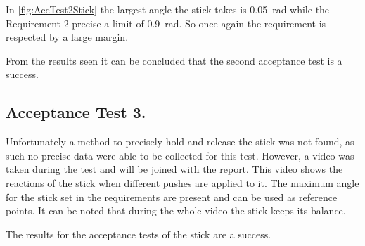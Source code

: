 In \autoref{fig:AccTest2Stick} the largest angle the stick takes is \SI{0.05}{\radian} while the Requirement 2 precise a limit of \SI{0.9}{\radian}. So once again the requirement is respected by a large margin.

From the results seen it can be concluded that the second acceptance test is a success.

\subsection{Acceptance Test 3.}

Unfortunately a method to precisely hold and release the stick was not found, as such no precise data were able to be collected for this test. However, a video was taken during the test and will be joined with the report. This video shows the reactions of the stick when different pushes are applied to it. The maximum angle for the stick set in the requirements are present and can be used as reference points. It can be noted that during the whole video the stick keeps its balance.

The results for the acceptance tests of the stick are a success.